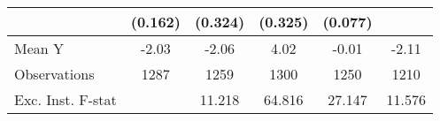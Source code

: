 {\begin{tabular}{l*{5}{c}}
            &     (0.162)         &     (0.324)         &     (0.325)         &     (0.077)         &                     \\
\midrule
Mean Y      &       -2.03         &       -2.06         &        4.02         &       -0.01         &       -2.11         \\
Observations&        1287         &        1259         &        1300         &        1250         &        1210         \\
Exc. Inst. F-stat&                     &      11.218         &      64.816         &      27.147         &      11.576         \\
\bottomrule
\end{tabular}
}
